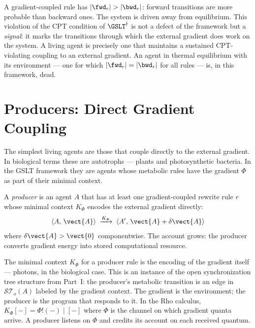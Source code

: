 \begin{remark}
A gradient-coupled rule has $|\fwd_r| > |\bwd_r|$: forward
transitions are more probable than backward ones.
The system is driven away from equilibrium.
This violation of the CPT condition of $\GSLT^\dagger$ is not a
defect of the framework but a \emph{signal}: it marks the
transitions through which the external gradient does work on the
system.
A living agent is precisely one that maintains a sustained
CPT-violating coupling to an external gradient.
An agent in thermal equilibrium with its environment --- one for
which $|\fwd_r| = |\bwd_r|$ for all rules --- is, in this
framework, dead.
\end{remark}

\section{Producers: Direct Gradient Coupling}

The simplest living agents are those that couple directly to the
external gradient.
In biological terms these are autotrophs --- plants and
photosynthetic bacteria.
In the GSLT framework they are agents whose metabolic rules have
the gradient $\Phi$ as part of their minimal context.

\begin{definition}[Producer]
A \emph{producer} is an agent $A$ that has at least one
gradient-coupled rewrite rule $r$ whose minimal context
$K_\Phi$ encodes the external gradient directly:
\[
  \langle A,\, \vect{A} \rangle
  \;\xrightarrow{K_\Phi}\;
  \langle A',\, \vect{A} + \delta\vect{A} \rangle
\]
where $\delta\vect{A} > \vect{0}$ componentwise.
The account grows: the producer converts gradient energy into
stored computational resource.
\end{definition}

\begin{remark}
The minimal context $K_\Phi$ for a producer rule is the encoding
of the gradient itself --- photons, in the biological case.
This is an instance of the open synchronization tree structure
from Part~I: the producer's metabolic transition is an edge in
$\mathcal{ST}_o(A)$ labeled by the gradient context.
The gradient is the environment; the producer is the program
that responds to it.
In the Rho calculus, $K_\Phi[-] = \Phi!(- ) \mid [-]$ where
$\Phi$ is the channel on which gradient quanta arrive.
A producer listens on $\Phi$ and credits its account on each
received quantum.
\end{remark}

